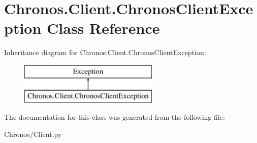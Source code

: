 \hypertarget{classChronos_1_1Client_1_1ChronosClientException}{}\section{Chronos.\+Client.\+Chronos\+Client\+Exception Class Reference}
\label{classChronos_1_1Client_1_1ChronosClientException}
Inheritance diagram for Chronos.\+Client.\+Chronos\+Client\+Exception\+:\begin{figure}[H]
\begin{center}
\leavevmode
\includegraphics[height=2.000000cm]{classChronos_1_1Client_1_1ChronosClientException}
\end{center}
\end{figure}


The documentation for this class was generated from the following file\+:\begin{DoxyCompactItemize}
\item 
Chronos/Client.\+py\end{DoxyCompactItemize}
